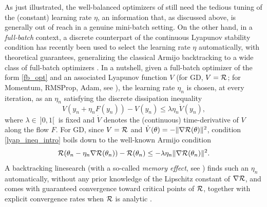 As just illustrated, the well-balanced optimizers of \cite{partI} still need the tedious tuning of the (constant) learning rate $\eta$, an information that, as discussed above, is generally out of reach in a genuine mini-batch setting.
On the other hand, in a {\em full-batch} context, a discrete counterpart of the continuous Lyapunov stability condition has recently been used to select the learning rate $\eta$ automatically, with theoretical guarantees, generalizing the classical Armijo backtracking to a wide class of full-batch optimizers \cite{Lyap_Theory_Bilel,Bilel_thesis,Bilel_ICML}. In a nutshell, given a full-batch optimizer of the form \eqref{fb_opt} and an associated Lyapunov function $V$ (for GD, $V=\mathcal{R}$; for Momentum, RMSProp, Adam, see \cite{Lyap_Theory_Bilel,Bilel_thesis}), the learning rate $\eta_n$ is chosen, at every iteration, as an $\eta_n$ satisfying the discrete dissipation inequality
\begin{equation}
	V(y_n+\eta_n F(y_n)) - V(y_n) \leq \lambda \eta_n \dot{V}(y_n),
	\label{lyap_ineq_intro}
\end{equation}
where $\lambda \in \ ]0,1[\ $ is fixed and $\dot V$ denotes the (continuous) time-derivative of $V$ along the flow $F$. For GD, since $V=\mathcal{R}$ and $\dot V(\theta)=-\|\nabla \mathcal{R}(\theta)\|^2$, condition \eqref{lyap_ineq_intro} boils down to the well-known Armijo condition
\begin{equation}
	\mathcal{R}(\theta_n-\eta_n \nabla \mathcal{R}(\theta_n)) -\mathcal{R}(\theta_n) \leq -\lambda \eta_n \|\nabla \mathcal{R}(\theta_n)\|^2.
	\label{armijo_full_intro}
\end{equation}
A backtracking linesearch (with a so-called {\em memory effect}, see \cite{Lyap_Theory_Bilel,Bilel_ICML,Bilel_thesis}) finds such an $\eta_n$ automatically, without any prior knowledge of the Lipschitz constant of $\nabla \mathcal{R}$, and comes with guaranteed convergence toward critical points of $\mathcal{R}$, together with explicit convergence rates when $\mathcal{R}$ is analytic \cite{Lyap_Theory_Bilel,Bilel_thesis}.

